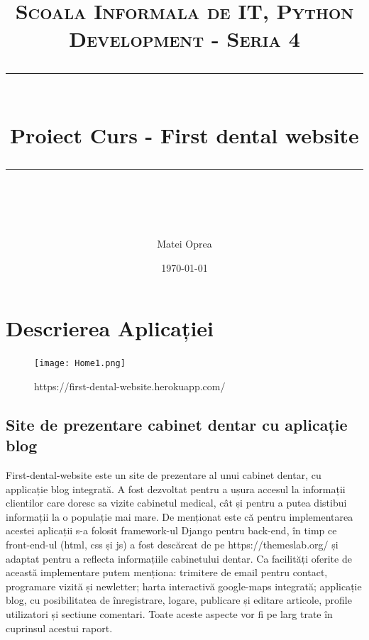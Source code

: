 \documentclass[11pt]{scrartcl} %
\title{	
	\normalfont\normalsize
	\textsc{Scoala Informala de IT, Python Development - Seria 4}\\ %
	\vspace{25pt} %
	\rule{\linewidth}{0.5pt}\\ %
	\vspace{20pt} %
	{\huge Proiect Curs - First dental website}\\ %
	\vspace{12pt} %
	\rule{\linewidth}{2pt}\\ %
	\vspace{12pt} %
}
\author{\LARGE Matei Oprea} %
\date{\normalsize\today} %
\begin{document}
\maketitle %

\pagebreak

\tableofcontents

\pagebreak

\section{Descrierea Aplicației}

\begin{figure}[h] %
	\centering
	\texttt{[image: Home1.png]} %
	\caption{https://first-dental-website.herokuapp.com/}
	\label{fig:acasa}
\end{figure}



\subsection{Site de prezentare cabinet dentar cu aplicație blog}

First-dental-website este un site de prezentare al unui cabinet dentar, cu applicație blog integrată. A fost dezvoltat pentru a ușura accesul la informații clientilor care doresc sa vizite cabinetul medical, cât și pentru a putea distibui informații la o populație mai mare. De menționat este că pentru implementarea acestei aplicații s-a folosit framework-ul Django pentru back-end, în timp ce front-end-ul (html, css și js) a fost descărcat de pe https://themeslab.org/ și adaptat pentru a reflecta informațiile cabinetului dentar. Ca facilități oferite de această implementare putem menționa: trimitere de email pentru contact, programare vizită și newletter; harta interactivă google-maps integrată; applicație blog, cu posibilitatea de înregistrare, logare, publicare și editare articole, profile utilizatori și sectiune comentari. Toate aceste aspecte vor fi pe larg trate în cuprinsul acestui raport. 


\pagebreak
\end{document}
